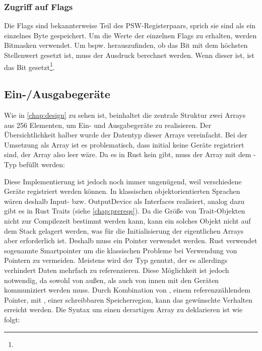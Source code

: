 \subsubsection{Zugriff auf Flags}

Die Flags sind bekannterweise Teil des \ac{PSW}-Registerpaars, sprich sie sind als ein einzelnes Byte gespeichert. Um die Werte der einzelnen Flags zu erhalten, werden Bitmasken verwendet. Um bspw. herauszufinden, ob das Bit mit dem höchsten Stellenwert gesetzt ist, muss der Ausdruck  berechnet werden. Wenn dieser  ist, ist das Bit gesetzt\footnote{}.

\subsection{Ein-/Ausgabegeräte}

Wie in \cref{chap:design} zu sehen ist, beinhaltet die zentrale Struktur zwei Arrays aus 256 Elementen, um Ein- und Ausgabegeräte zu realisieren. Der Übersichtlichkeit halber wurde der Datentyp dieser Arrays vereinfacht. Bei der Umsetzung als Array ist es problematisch, dass initial keine Geräte registriert sind, der Array also leer wäre. Da es in Rust kein  gibt, muss der Array mit dem -Typ befüllt werden:

\qquad{}

Diese Implementierung ist jedoch noch immer ungenügend, weil verschiedene Geräte registriert werden können. In klassischen objektorientierten Sprachen wären deshalb Input- bzw. OutputDevice als Interfaces realisiert, analog dazu gibt es in Rust Traits (siehe \cref{chap:prereqs}). Da die Größe von Trait-Objekten nicht zur Compilezeit bestimmt werden kann, kann ein solches Objekt nicht auf dem Stack gelagert werden, was für die Initialisierung der eigentlichen Arrays aber  erforderlich ist. Deshalb muss ein Pointer verwendet werden. Rust verwendet sogenannte \glqq Smartpointer\grqq{} um die klassischen Probleme bei Verwendung von Pointern zu vermeiden. Meistens wird der Typ  genutzt, der es allerdings verhindert Daten mehrfach zu referenzieren. Diese Möglichkeit ist jedoch notwendig, da sowohl von außen, als auch von innen mit den Geräten kommuniziert werden muss. Durch Kombination von , einem referenzzählendem Pointer, mit , einer schreibbaren Speicherregion, kann das gewünschte Verhalten erreicht werden. Die Syntax um einen derartigen Array zu deklarieren ist wie folgt:

